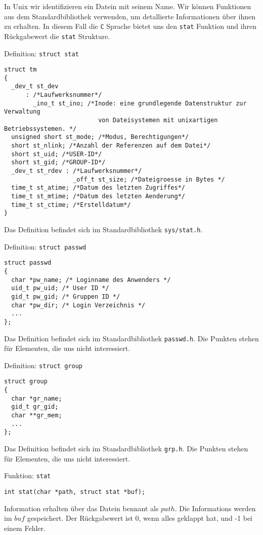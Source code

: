 In Unix wir identifizieren ein Datein mit seinem Name. Wir können Funktionen aus dem Standardbibliothek verwenden, um
detallierte Informationen über ihnen zu erhalten. In diesem Fall die \texttt{C} Sprache bietet uns den \texttt{stat} Funktion 
und ihren Rückgabewert die \texttt{stat} Strukture. 
\begin{mydefinitionblock}{Definition: \texttt{struct stat}}
\begin{lstlisting}
struct tm
{
  _dev_t st_dev
      : /*Laufwerksnummer*/
        _ino_t st_ino; /*Inode: eine grundlegende Datenstruktur zur Verwaltung
                          von Dateisystemen mit unixartigen Betriebssystemen. */
  unsigned short st_mode; /*Modus, Berechtigungen*/
  short st_nlink; /*Anzahl der Referenzen auf dem Datei*/
  short st_uid; /*USER-ID*/
  short st_gid; /*GROUP-ID*/
  _dev_t st_rdev : /*Laufwerksnummer*/
                   _off_t st_size; /*Dateigroesse in Bytes */
  time_t st_atime; /*Datum des letzten Zugriffes*/
  time_t st_mtime; /*Datum des letzten Aenderung*/
  time_t st_ctime; /*Erstelldatum*/
}
\end{lstlisting}
\vspace{-0.4cm}
Das Definition befindet sich im Standardbibliothek \texttt{sys/stat.h}.
\end{mydefinitionblock}
\begin{mydefinitionblock}{Definition: \texttt{struct passwd}}
\begin{lstlisting}
struct passwd
{
  char *pw_name; /* Loginname des Anwenders */
  uid_t pw_uid; /* User ID */
  gid_t pw_gid; /* Gruppen ID */
  char *pw_dir; /* Login Verzeichnis */
  ...
};
\end{lstlisting}
\vspace{-0.4cm}
Das Definition befindet sich im Standardbibliothek \texttt{passwd.h}.
Die Punkten stehen für Elementen, die uns nicht interessiert.
\end{mydefinitionblock}
\begin{mydefinitionblock}{Definition: \texttt{struct group}}
\begin{lstlisting}
struct group
{
  char *gr_name;
  gid_t gr_gid;
  char **gr_mem;
  ...
};
\end{lstlisting}
\vspace{-0.4cm}
Das Definition befindet sich im Standardbibliothek \texttt{grp.h}.
Die Punkten stehen für Elementen, die uns nicht interessiert.
\end{mydefinitionblock}
\begin{mydefinitionblock}{Funktion: \texttt{stat}}
\begin{lstlisting}
int stat(char *path, struct stat *buf);
\end{lstlisting}
\vspace{-.4cm}
Information erhalten über das Datein bennant als $path$. Die Informations werden im $buf$ gespeichert.
Der Rückgabewert ist 0, wenn alles geklappt hat, und -1 bei einem Fehler.
\end{mydefinitionblock}
